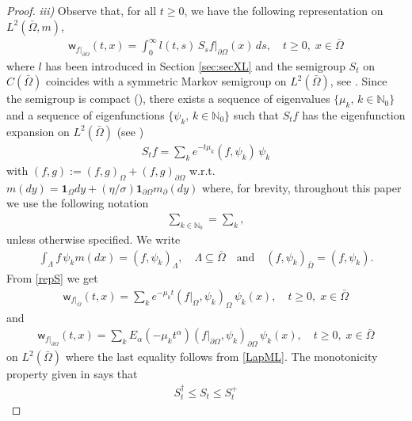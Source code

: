\documentclass[11pt,a4paper]{article}
\newcommand{\magenta}{black}
\begin{document}
\begin{proof}
\textit{iii)} Observe that, for all $t \geq 0$, we have the following representation on $L^2(\bar{\Omega}, m)$,
\begin{align*}
\mathsf{w}_{f|_{\partial \Omega}} (t,x) = \int_0^\infty l(t,s)\, S_s f|_{\partial \Omega} (x)\, ds, \quad t\geq 0,\; x \in \bar{\Omega}
\end{align*}
where $l$ has been introduced in Section \ref{sec:secXL} and the semigroup $S_t$ on $C(\bar{\Omega})$ coincides with a symmetric Markov semigroup on $L^2(\bar{\Omega})$, see \cite[Theorem 2.3]{AMPR03}. Since the semigroup is compact (\cite[Corollary 2.7]{AMPR03}), there exists a sequence of eigenvalues $\{\mu_k,\, k \in \mathbb{N}_0\}$ and a sequence of eigenfunctions $\{\psi_k,\, k \in \mathbb{N}_0\}$ such that $S_t f$ has the eigenfunction expansion on $L^2(\bar{\Omega})$ (see \cite{BvonBR06,vBelFra})  
\begin{align}
S_t f = \sum_k e^{-t \mu_k } (f, \psi_k) \, \psi_k
\label{uf0}
\end{align}
with $(f,g) := (f,g)_\Omega + (f,g)_{\partial \Omega}$ w.r.t. $m(dy) = \mathbf{1}_{\Omega} dy +(\eta/\sigma) \mathbf{1}_{\partial \Omega} m_\partial (dy)$ {\color{\magenta} where, for brevity, throughout this paper we use the following notation
\begin{align*}
\sum_{k \in \mathbb{N}_0} = \sum_k,
\end{align*}
unless otherwise specified.} We write
\begin{align*}
\int_\Lambda f \, \psi_k m(dx) = (f, \psi_k )_\Lambda, \quad \Lambda \subseteq \bar{\Omega} \quad \textrm{and} \quad (f, \psi_k)_{\bar{\Omega}} = (f, \psi_k).
\end{align*} 
From \eqref{repS} we get
\begin{align}
\mathsf{w}_{f|_{\Omega}} (t,x) = \sum_k e^{-\mu_k t}(f|_{\Omega}, \psi_k )_{\Omega}\, \psi_k(x), \quad t\geq 0,\; x \in \bar{\Omega}
\label{uf1}
\end{align}
and
\begin{align}
\mathsf{w}_{f|_{\partial \Omega}} (t,x) = \sum_k E_\alpha(-\mu_k t^\alpha) (f|_{\partial \Omega}, \psi_k )_{\partial \Omega}\, \psi_k(x) , \quad t\geq 0,\; x \in \bar{\Omega}
\label{uf2}
\end{align}
on $L^2(\bar{\Omega})$ where the last equality follows from \eqref{LapML}. The monotonicity property given in \cite[Theorem 3.5]{AMPR03} says that 
\begin{align}
\label{monotS}
S^\dagger_t \leq S_t \leq S^+_t
\end{align}

\end{proof}
\end{document}
